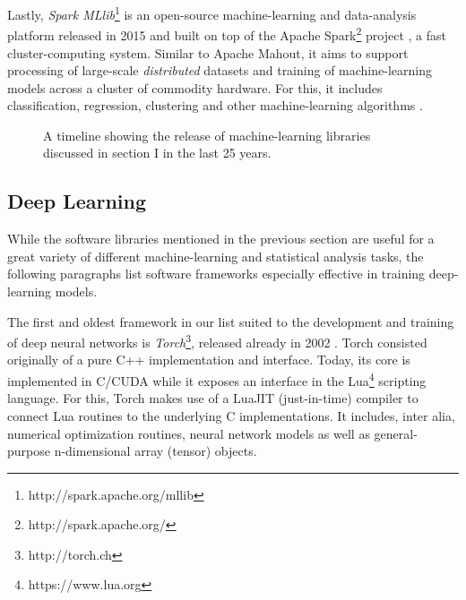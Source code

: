 Lastly, \emph{Spark MLlib}\footnote{http://spark.apache.org/mllib} is an
open-source machine-learning and data-analysis platform released in 2015 and
built on top of the Apache Spark\footnote{http://spark.apache.org/} project
\cite{spark}, a fast cluster-computing system. Similar to Apache Mahout, it aims
to support processing of large-scale \emph{distributed} datasets and training of
machine-learning models across a cluster of commodity hardware. For this, it
includes classification, regression, clustering and other machine-learning
algorithms \cite{mllib}.

\begin{figure*}[t!]
\centering
\label{fig:timeline}
\caption{A timeline showing the release of machine-learning libraries discussed
  in section I in the last 25 years.}
\end{figure*}

\subsection{Deep Learning}

While the software libraries mentioned in the previous section are useful for a
great variety of different machine-learning and statistical analysis tasks, the
following paragraphs list software frameworks especially effective in training
deep-learning models.

The first and oldest framework in our list suited to the development and
training of deep neural networks is \emph{Torch}\footnote{http://torch.ch},
released already in 2002 \cite{torch}. Torch consisted originally of a pure C++
implementation and interface. Today, its core is implemented in C/CUDA while it
exposes an interface in the Lua\footnote{https://www.lua.org} scripting
language. For this, Torch makes use of a LuaJIT (just-in-time) compiler to
connect Lua routines to the underlying C implementations. It includes, inter
alia, numerical optimization routines, neural network models as well as
general-purpose n-dimensional array (tensor) objects.

